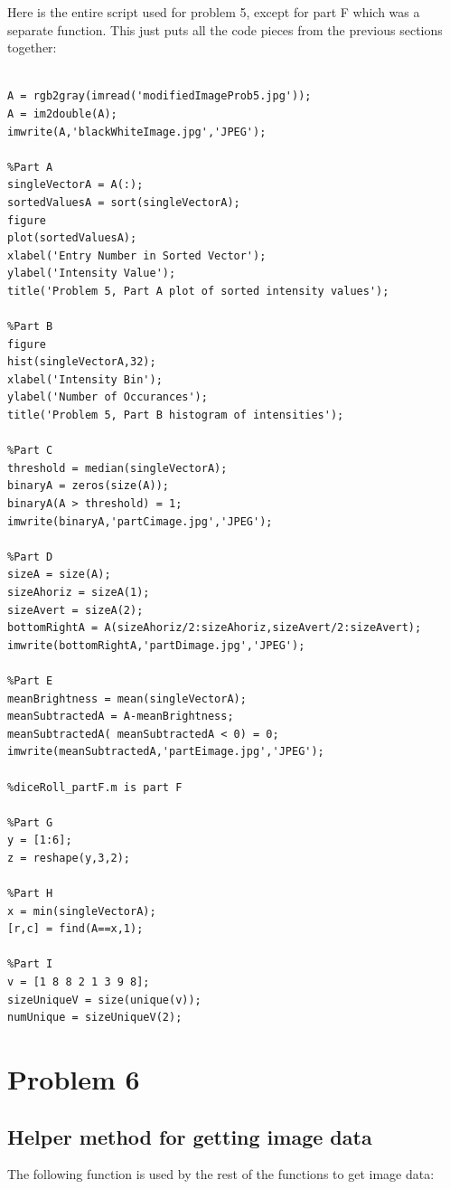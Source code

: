 \documentclass[11pt,psfig]{article}
\begin{document}
Here is the entire script used for problem 5, except for part F which was a separate function. This just puts all the code pieces from the previous sections together:

\begin{verbatim}

A = rgb2gray(imread('modifiedImageProb5.jpg'));
A = im2double(A);
imwrite(A,'blackWhiteImage.jpg','JPEG');

%Part A
singleVectorA = A(:);
sortedValuesA = sort(singleVectorA);
figure
plot(sortedValuesA);
xlabel('Entry Number in Sorted Vector');
ylabel('Intensity Value');
title('Problem 5, Part A plot of sorted intensity values');

%Part B
figure
hist(singleVectorA,32);
xlabel('Intensity Bin');
ylabel('Number of Occurances');
title('Problem 5, Part B histogram of intensities');

%Part C
threshold = median(singleVectorA);
binaryA = zeros(size(A));
binaryA(A > threshold) = 1;
imwrite(binaryA,'partCimage.jpg','JPEG');

%Part D
sizeA = size(A);
sizeAhoriz = sizeA(1);
sizeAvert = sizeA(2);
bottomRightA = A(sizeAhoriz/2:sizeAhoriz,sizeAvert/2:sizeAvert);
imwrite(bottomRightA,'partDimage.jpg','JPEG');

%Part E
meanBrightness = mean(singleVectorA);
meanSubtractedA = A-meanBrightness;
meanSubtractedA( meanSubtractedA < 0) = 0;
imwrite(meanSubtractedA,'partEimage.jpg','JPEG');

%diceRoll_partF.m is part F

%Part G
y = [1:6];
z = reshape(y,3,2);

%Part H
x = min(singleVectorA);
[r,c] = find(A==x,1);

%Part I
v = [1 8 8 2 1 3 9 8];
sizeUniqueV = size(unique(v));
numUnique = sizeUniqueV(2);

\end{verbatim}

\newpage

\section*{Problem 6}

\subsection*{Helper method for getting image data}

The following function is used by the rest of the functions to get image data:
\end{document}
